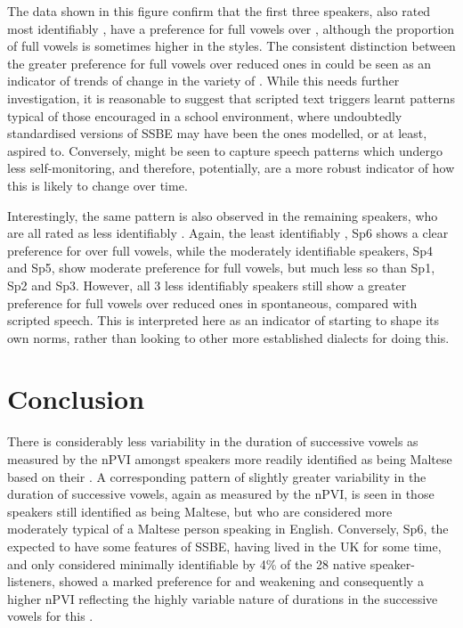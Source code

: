 \documentclass[output=paper]{langsci/langscibook}
\begin{document}
The data shown in this figure confirm that the first three speakers, also rated most identifiably , have a preference for full vowels over , although the proportion of full vowels is sometimes higher in the  styles. The consistent distinction between the greater preference for full vowels over reduced ones in  could be seen as an indicator of trends of change in the variety of . While this needs further investigation, it is reasonable to suggest that scripted text triggers learnt patterns typical of those encouraged in a school environment, where undoubtedly standardised versions of SSBE may have been the ones modelled, or at least, aspired to. Conversely,  might be seen to capture speech patterns which undergo less self-monitoring, and therefore, potentially, are a more robust indicator of how this  is likely to change over time. 

Interestingly, the same pattern is also observed in the remaining speakers, who are all rated as less identifiably . Again, the least identifiably  , Sp6 shows a clear preference for  over full vowels, while the moderately identifiable  speakers, Sp4 and Sp5, show moderate preference for full vowels, but much less so than Sp1, Sp2 and Sp3. However, all 3 less identifiably  speakers still show a greater preference for full vowels over reduced ones in spontaneous, compared with scripted speech. This is interpreted here as an indicator of  starting to shape its own norms, rather than looking to other more established dialects for doing this. 

\section{Conclusion}
There is considerably less variability in the duration of successive vowels as measured by the nPVI amongst speakers more readily identified as being Maltese based on their  . A corresponding pattern of slightly greater variability in the duration of successive vowels, again as measured by the nPVI, is seen in those speakers still identified as being Maltese, but who are considered more moderately typical of a Maltese person speaking in English. Conversely, Sp6, the  expected to have some features of SSBE, having lived in the UK for some time, and only considered minimally identifiable by 4\% of the 28 native  speaker-listeners, showed a marked preference for  and  weakening and consequently a higher nPVI reflecting the highly variable nature of durations in the successive vowels for this . 
\end{document}
